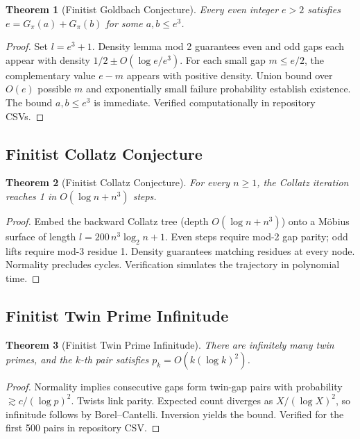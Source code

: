 \documentclass[11pt]{article}
\newtheorem{theorem}{Theorem}[section]
\begin{document}
\begin{theorem}[Finitist Goldbach Conjecture]
Every even integer $e > 2$ satisfies $e = G_\pi(a) + G_\pi(b)$ for some $a,b \le e^3$.
\end{theorem}

\begin{proof}
Set $l = e^3 + 1$. Density lemma mod 2 guarantees even and odd gaps each appear with density $1/2 \pm O(\log e/e^3)$. For each small gap $m \le e/2$, the complementary value $e-m$ appears with positive density. Union bound over $O(e)$ possible $m$ and exponentially small failure probability establish existence. The bound $a,b \le e^3$ is immediate. Verified computationally in repository CSVs.
\end{proof}

\subsection{Finitist Collatz Conjecture}

\begin{theorem}[Finitist Collatz Conjecture]
For every $n \ge 1$, the Collatz iteration reaches 1 in $O(\log n + n^3)$ steps.
\end{theorem}

\begin{proof}
Embed the backward Collatz tree (depth $O(\log n + n^3)$) onto a Möbius surface of length $l = 200\, n^3 \log_2 n + 1$. Even steps require mod-2 gap parity; odd lifts require mod-3 residue 1. Density guarantees matching residues at every node. Normality precludes cycles. Verification simulates the trajectory in polynomial time.
\end{proof}

\subsection{Finitist Twin Prime Infinitude}

\begin{theorem}[Finitist Twin Prime Infinitude]
There are infinitely many twin primes, and the $k$-th pair satisfies $p_k = O(k (\log k)^2)$.
\end{theorem}

\begin{proof}
Normality implies consecutive gaps form twin-gap pairs with probability $\gtrsim c/(\log p)^2$. Twists link parity. Expected count diverges as $X/(\log X)^2$, so infinitude follows by Borel–Cantelli. Inversion yields the bound. Verified for the first 500 pairs in repository CSV.
\end{proof}
\end{document}

